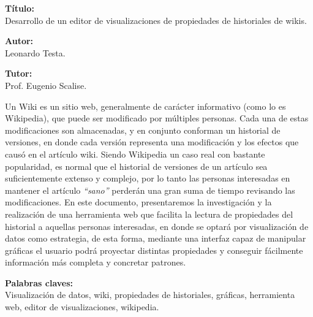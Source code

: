 \textbf{Título:}\\
Desarrollo de un editor de visualizaciones de propiedades de historiales de wikis.

\textbf{Autor:}\\
Leonardo Testa.

\textbf{Tutor:}\\
Prof. Eugenio Scalise.

Un Wiki es un sitio web, generalmente de carácter informativo (como lo es Wikipedia), que puede ser modificado por múltiples personas. Cada una de estas modificaciones son almacenadas, y en conjunto conforman un historial de versiones, en donde cada versión representa una modificación y los efectos que causó en el artículo wiki.
Siendo Wikipedia un caso real con bastante popularidad, es normal que el historial de versiones de un artículo sea suficientemente extenso y complejo, por lo tanto las personas interesadas en mantener el artículo \textit{“sano”} perderán una gran suma de tiempo revisando las modificaciones.
En este documento, presentaremos la investigación y la realización de una herramienta web que facilita la lectura de propiedades del historial a aquellas personas interesadas, en donde se optará por visualización de datos como estrategia, de esta forma, mediante una interfaz capaz de manipular gráficas el usuario podrá proyectar distintas propiedades y conseguir fácilmente información más completa y concretar patrones.


\textbf{Palabras claves:}\\
Visualización de datos, wiki, propiedades de historiales, gráficas, herramienta web, editor de visualizaciones, wikipedia.
